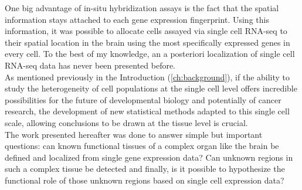One big advantage of in-situ hybridization assays is the fact that the spatial information stays attached to each gene expression fingerprint. Using this information, it was possible to allocate cells assayed via single cell RNA-seq to their spatial location in the brain using the most specifically expressed genes in every cell. To the best of my knowledge, an a posteriori localization of single cell RNA-seq data has never been presented before.\\

As mentioned previously in the Introduction (\ref{ch:background}), if the ability to study the heterogeneity of cell populations at the single cell level offers incredible possibilities for the future of developmental biology and potentially of cancer research, the development of new statistical methods adapted to this single cell scale, allowing conclusions to be drawn at the tissue level is crucial.\\

The work presented hereafter was done to answer simple but important questions: can known functional tissues of a complex organ like the brain be defined and localized from single gene expression data? Can unknown regions in such a complex tissue be detected and finally, is it possible to hypothesize the functional role of those unknown regions based on single cell expression data?


	
	



